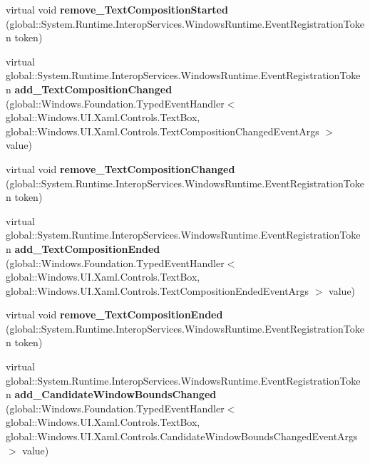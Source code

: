 \begin{DoxyCompactItemize}
virtual void {\bfseries remove\+\_\+\+Text\+Composition\+Started} (global\+::\+System.\+Runtime.\+Interop\+Services.\+Windows\+Runtime.\+Event\+Registration\+Token token)
\item 
\mbox{\label{class_windows_1_1_u_i_1_1_xaml_1_1_controls_1_1_text_box_a4ea12e73d910d27530312ae26996c11a}} 
virtual global\+::\+System.\+Runtime.\+Interop\+Services.\+Windows\+Runtime.\+Event\+Registration\+Token {\bfseries add\+\_\+\+Text\+Composition\+Changed} (global\+::\+Windows.\+Foundation.\+Typed\+Event\+Handler$<$ global\+::\+Windows.\+U\+I.\+Xaml.\+Controls.\+Text\+Box, global\+::\+Windows.\+U\+I.\+Xaml.\+Controls.\+Text\+Composition\+Changed\+Event\+Args $>$ value)
\item 
\mbox{\label{class_windows_1_1_u_i_1_1_xaml_1_1_controls_1_1_text_box_ae941b45f52cc8e88d708275c4313ef9a}} 
virtual void {\bfseries remove\+\_\+\+Text\+Composition\+Changed} (global\+::\+System.\+Runtime.\+Interop\+Services.\+Windows\+Runtime.\+Event\+Registration\+Token token)
\item 
\mbox{\label{class_windows_1_1_u_i_1_1_xaml_1_1_controls_1_1_text_box_a1ec5fb1c372d817e2d83ca0f4160361d}} 
virtual global\+::\+System.\+Runtime.\+Interop\+Services.\+Windows\+Runtime.\+Event\+Registration\+Token {\bfseries add\+\_\+\+Text\+Composition\+Ended} (global\+::\+Windows.\+Foundation.\+Typed\+Event\+Handler$<$ global\+::\+Windows.\+U\+I.\+Xaml.\+Controls.\+Text\+Box, global\+::\+Windows.\+U\+I.\+Xaml.\+Controls.\+Text\+Composition\+Ended\+Event\+Args $>$ value)
\item 
\mbox{\label{class_windows_1_1_u_i_1_1_xaml_1_1_controls_1_1_text_box_a5973df0b80c264046f580c78b04aeb61}} 
virtual void {\bfseries remove\+\_\+\+Text\+Composition\+Ended} (global\+::\+System.\+Runtime.\+Interop\+Services.\+Windows\+Runtime.\+Event\+Registration\+Token token)
\item 
\mbox{\label{class_windows_1_1_u_i_1_1_xaml_1_1_controls_1_1_text_box_a0f417de69db14b9dda18a6b486367ec7}} 
virtual global\+::\+System.\+Runtime.\+Interop\+Services.\+Windows\+Runtime.\+Event\+Registration\+Token {\bfseries add\+\_\+\+Candidate\+Window\+Bounds\+Changed} (global\+::\+Windows.\+Foundation.\+Typed\+Event\+Handler$<$ global\+::\+Windows.\+U\+I.\+Xaml.\+Controls.\+Text\+Box, global\+::\+Windows.\+U\+I.\+Xaml.\+Controls.\+Candidate\+Window\+Bounds\+Changed\+Event\+Args $>$ value)

\end{DoxyCompactItemize}
